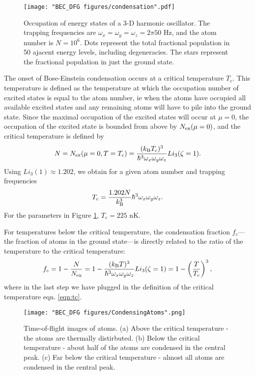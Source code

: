 \begin{figure}
	\texttt{[image: "BEC\_DFG figures/condensation".pdf]}
\caption[Occupation of energy states of a 3-D harmonic oscillator]{Occupation of energy states of a 3-D harmonic oscillator. The trapping frequencies are $\omega_x=\omega_y=\omega_z=2\pi 50$ Hz, and the atom number is $N=10^6$. Dots represent the total fractional population in 50 ajacent energy levels, including degeneracies. The stars represent the fractional population in just the ground state.  }
\label{fig:BoseDistribution}
\end{figure}

The onset of Bose-Einstein condensation occurs at a critical temperature $T_c$. This temperature is defined as the temperature at which the occupation number of excited states is equal to the atom number, ie when the atoms have occupied all available excited states and any remaining atoms will have to pile into the ground state. Since the maximal occupation of the excited states will occur at $\mu=0$, the occupation of the excited state is bounded from above by $N_{\rm ex}(\mu=0)$, and the critical temperature is defined by 
\begin{equation}
N=N_{\rm ex}(\mu=0, T=T_c)=\frac{(k_{\rm B}T_c)^3}{\hbar^3 \omega_x \omega_y \omega_z}Li_3(\zeta=1).
\end{equation}
Using $Li_3(1)\approx1.202$, we obtain for a given atom number and trapping frequencies
\begin{equation}
T_c = \frac{1.202 N}{k_{\rm B}^3}\hbar^3 \omega_x \omega_y \omega_z.
\label{eqn:tc}
\end{equation}
For the parameters in Figure \ref{fig:BoseDistribution}, $T_c = 225$ nK. 

For temperatures below the critical temperature, the condensation fraction $f_c$---the fraction of atoms in the ground state---is directly related to the ratio of the temperature to the critical temperature:
\begin{equation}
f_c=1-\frac{N}{N_{\rm ex}}=1-\frac{(k_{\rm B}T)^3}{\hbar^3 \omega_x \omega_y \omega_z}Li_3(\zeta=1)=1-\left(\frac{T}{T_c}\right)^3,
\end{equation}
where in the last step we have plugged in the definition of the critical temperature eqn. \ref{eqn:tc}.

\begin{figure}
	\texttt{[image: "BEC\_DFG figures/CondensingAtoms".png]}
\caption[Time-of-flight images of atoms]{Time-of-flight images of atoms. (a) Above the critical temperature - the atoms are thermally distirbuted. (b) Below the critical temperature - about half of the atoms are condensed in the central peak. (c) Far below the critical temperature - almost all atoms are condensed in the central peak.}
\label{fig:CondensingAtoms}
\end{figure}

